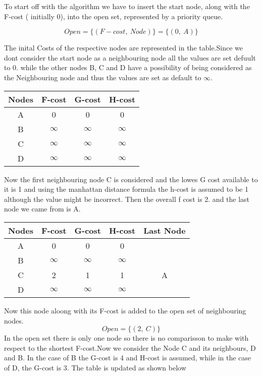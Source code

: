 To start off with the algorithm we have to insert the start node, along with the F-cost ( initially 0), into the open set, represented by a priority queue. 

\[Open = \{(F-cost, \ Node)\} = \{(0, \ A)\}\]

The inital Costs of the respective nodes are represented in the table.Since we dont consider the start node as a neighbouring node all the values are set defuult to 0. while the other nodes B, C and D have a possibility of being considered as the Neighbouring node and thus the values are set as default to $\infty$. 
\begin{center}
\begin{tabular}{ |c|c|c|c| } 
\hline
Nodes & F-cost & G-cost & H-cost \\
\hline 
A & 0 & 0 & 0\\ 
B & $\infty$ & $\infty$ & $\infty$\\ 
C & $\infty$ & $\infty$ & $\infty$\\ 
D & $\infty$ & $\infty$ & $\infty$\\
\hline
\end{tabular}
\end{center}

Now the first neighbouring node C is considered and the lowes G cost available to it is 1 and using the manhattan distance formula the h-cost is assumed to be 1 although the value might be incorrect. Then the overall f cost is 2. and the last node we came from is A. 

\begin{center}
\begin{tabular}{ |c|c|c|c|c| } 
\hline
Nodes & F-cost & G-cost & H-cost & Last Node \\
\hline 
A & 0 & 0 & 0 &\\ 
B & $\infty$ & $\infty$ & $\infty$ &\\ 
C & 2 & 1 & 1 & A\\ 
D & $\infty$ & $\infty$ & $\infty$ &\\
\hline
\end{tabular}
\end{center}
Now this node aloong with its F-cost is added to the open set of neighbouring nodes.
\[Open = \{(2, \ C)\}\]
In the open set there is only one node so there is no comparisson to make with respect to the shortest F-cost.Now we consider the Node C and its neighbours, D and B. In the case of B the G-cost is 4 and H-cost is assumed, while in the case of D, the G-cost is 3. 
    The table is updated as shown below


